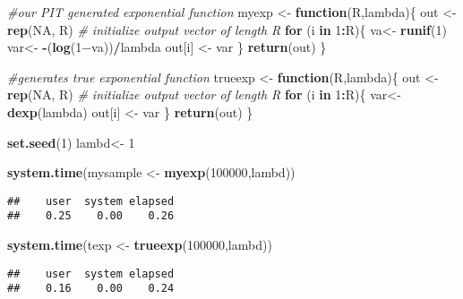 \documentclass[
]{article}
\newenvironment{Shaded}{\begin{snugshade}}{\end{snugshade}}
\newcommand{\CommentTok}[1]{\textcolor[rgb]{0.56,0.35,0.01}{\textit{#1}}}
\newcommand{\ControlFlowTok}[1]{\textcolor[rgb]{0.13,0.29,0.53}{\textbf{#1}}}
\newcommand{\DecValTok}[1]{\textcolor[rgb]{0.00,0.00,0.81}{#1}}
\newcommand{\KeywordTok}[1]{\textcolor[rgb]{0.13,0.29,0.53}{\textbf{#1}}}
\newcommand{\NormalTok}[1]{#1}
\newcommand{\OperatorTok}[1]{\textcolor[rgb]{0.81,0.36,0.00}{\textbf{#1}}}
\newcommand{\OtherTok}[1]{\textcolor[rgb]{0.56,0.35,0.01}{#1}}
\newcommand{\StringTok}[1]{\textcolor[rgb]{0.31,0.60,0.02}{#1}}
\begin{document}
\begin{Shaded}
\begin{Highlighting}[]
\CommentTok{#our PIT generated exponential function}
\NormalTok{myexp <-}\StringTok{ }\ControlFlowTok{function}\NormalTok{(R,lambda)\{}
\NormalTok{out <-}\StringTok{ }\KeywordTok{rep}\NormalTok{(}\OtherTok{NA}\NormalTok{, R) }\CommentTok{# initialize output vector of length R}
\ControlFlowTok{for}\NormalTok{ (i }\ControlFlowTok{in} \DecValTok{1}\OperatorTok{:}\NormalTok{R)\{}
\NormalTok{va<-}\StringTok{ }\KeywordTok{runif}\NormalTok{(}\DecValTok{1}\NormalTok{)}
\NormalTok{var<-}\StringTok{ }\OperatorTok{-}\NormalTok{(}\KeywordTok{log}\NormalTok{(1−va))}\OperatorTok{/}\NormalTok{lambda}
\NormalTok{out[i] <-}\StringTok{ }\NormalTok{var}
\NormalTok{\}}
\KeywordTok{return}\NormalTok{(out)}
\NormalTok{\}}

\CommentTok{#generates true exponential function}
\NormalTok{trueexp <-}\StringTok{ }\ControlFlowTok{function}\NormalTok{(R,lambda)\{}
\NormalTok{out <-}\StringTok{ }\KeywordTok{rep}\NormalTok{(}\OtherTok{NA}\NormalTok{, R) }\CommentTok{# initialize output vector of length R}
\ControlFlowTok{for}\NormalTok{ (i }\ControlFlowTok{in} \DecValTok{1}\OperatorTok{:}\NormalTok{R)\{}
\NormalTok{var<-}\StringTok{ }\KeywordTok{dexp}\NormalTok{(lambda)}
\NormalTok{out[i] <-}\StringTok{ }\NormalTok{var}
\NormalTok{\}}
\KeywordTok{return}\NormalTok{(out)}
\NormalTok{\}}

\KeywordTok{set.seed}\NormalTok{(}\DecValTok{1}\NormalTok{)}
\NormalTok{lambd<-}\StringTok{ }\DecValTok{1}

\KeywordTok{system.time}\NormalTok{(mysample <-}\StringTok{ }\KeywordTok{myexp}\NormalTok{(}\DecValTok{100000}\NormalTok{,lambd))}
\end{Highlighting}
\end{Shaded}

\begin{verbatim}
##    user  system elapsed 
##    0.25    0.00    0.26
\end{verbatim}

\begin{Shaded}
\begin{Highlighting}[]
\KeywordTok{system.time}\NormalTok{(texp <-}\StringTok{ }\KeywordTok{trueexp}\NormalTok{(}\DecValTok{100000}\NormalTok{,lambd))}
\end{Highlighting}
\end{Shaded}

\begin{verbatim}
##    user  system elapsed 
##    0.16    0.00    0.24
\end{verbatim}
\end{document}
